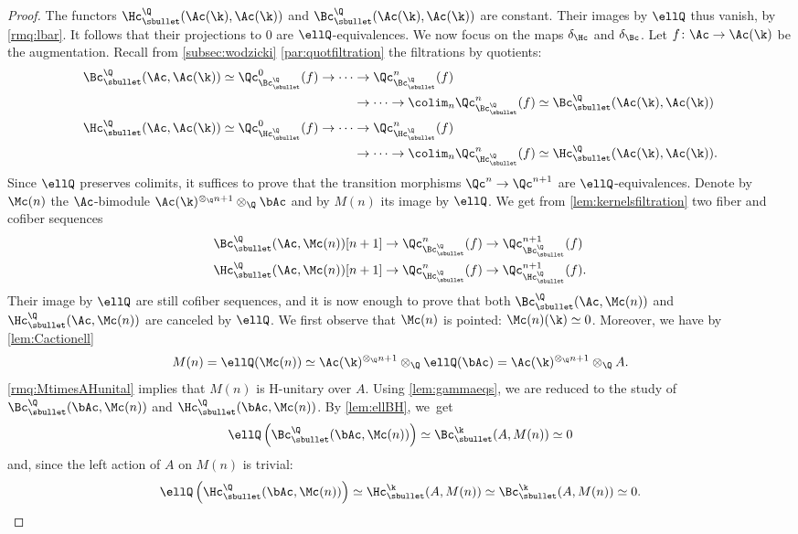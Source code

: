 \begin{proof}
The functors $\Hc_\sbullet^\Q(\Ac(\k), \Ac(\k))$ and $\Bc_\sbullet^\Q(\Ac(\k), \Ac(\k))$ are constant. Their images by $\ellQ$ thus vanish, by \autoref{rmq:lbar}. It follows that their projections to $0$ are $\ellQ$-equivalences.
We now focus on the maps $\delta_\Hc$ and $\delta_\Bc$. Let $f \colon \Ac \to \Ac(\k)$ be the augmentation.
Recall from \autoref{subsec:wodzicki} \autoref{par:quotfiltration} the filtrations by quotients:
\begin{align*}
\Bc_\sbullet^\Q(\Ac,\Ac(\k)) \simeq \Qc_{\Bc_\sbullet^\Q}^0(f) \to \cdots &\to \Qc_{\Bc_\sbullet^\Q}^n(f)\\
&\to \cdots\to \colim_n \Qc_{\Bc_\sbullet^\Q}^n(f) \simeq \Bc_\sbullet^\Q(\Ac(\k),\Ac(\k))\\
\Hc_\sbullet^\Q(\Ac,\Ac(\k)) \simeq \Qc_{\Hc_\sbullet^\Q}^0(f) \to \cdots &\to \Qc_{\Hc_\sbullet^\Q}^n(f)\\
& \to \cdots\to \colim_n \Qc_{\Hc_\sbullet^\Q}^n(f) \simeq \Hc_\sbullet^\Q(\Ac(\k),\Ac(\k)).
\end{align*}
Since $\ellQ$ preserves colimits, it suffices to prove that the transition morphisms $\Qc^n \to \Qc^{n+1}$ are $\ellQ$-equivalences.
Denote by $\Mc(n)$ the $\Ac$-bimodule $\Ac(\k)^{\otimes_\Q n+1} \otimes_\Q \bAc$ and by $M(n)$ its image by $\ellQ$. We get from \autoref{lem:kernelsfiltration} two fiber and cofiber sequences
\begin{align*}
\Bc_\sbullet^\Q(\Ac, \Mc(n))[n+1] &\to \Qc_{\Bc_\sbullet^\Q}^n(f) \to \Qc_{\Bc_\sbullet^\Q}^{n+1}(f) \\
\Hc_\sbullet^\Q(\Ac, \Mc(n))[n+1] &\to \Qc_{\Hc_\sbullet^\Q}^n(f) \to \Qc_{\Hc_\sbullet^\Q}^{n+1}(f).
\end{align*}
Their image by $\ellQ$ are still cofiber sequences, and it is now enough to prove that both $\Bc_\sbullet^\Q(\Ac, \Mc(n))$ and $\Hc_\sbullet^\Q(\Ac, \Mc(n))$ are canceled by $\ellQ$.
We first observe that $\Mc(n)$ is pointed: $\Mc(n)(\k) \simeq 0$. Moreover, we have by \autoref{lem:Cactionell}
\[
M(n) = \ellQ(\Mc(n)) \simeq \Ac(\k)^{\otimes_\Q n+1} \otimes_\Q \ellQ(\bAc) = \Ac(\k)^{\otimes_\Q n+1} \otimes_\Q A.
\]
\autoref{rmq:MtimesAHunital} implies that $M(n)$ is H-unitary over $A$. Using \autoref{lem:gammaeqs}, we are reduced to the study of $\Bc_\sbullet^\Q(\bAc, \Mc(n))$ and $\Hc_\sbullet^\Q(\bAc, \Mc(n))$. By \autoref{lem:ellBH}, we~get
\[
\ellQ\left( \Bc_\sbullet^\Q(\bAc, \Mc(n)) \right) \simeq \Bc_\sbullet^\k(A,M(n)) \simeq 0
\]
and, since the left action of $A$ on $M(n)$ is trivial:
\[
\ellQ\left( \Hc_\sbullet^\Q(\bAc, \Mc(n)) \right) \simeq \Hc_\sbullet^\k(A,M(n)) \simeq \Bc_\sbullet^\k(A,M(n)) \simeq 0.\qedhere
\]
\end{proof}

